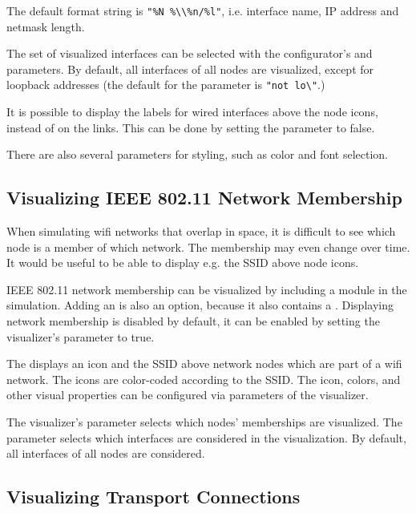 The default format string is
\texttt{"\%N \%\textbackslash\textbackslash\%n/\%l"}, i.e. interface name, IP address and
netmask length.

The set of visualized interfaces can be selected with the configurator's
 and  parameters. By default, all
interfaces of all nodes are visualized, except for loopback addresses (the default for the
 parameter is \texttt{"not lo\textbackslash*"}.)

It is possible to display the labels for wired interfaces above the node icons,
instead of on the links. This can be done by setting the
 parameter to false.

There are also several parameters for styling, such as color and font selection.


\subsection{Visualizing IEEE 802.11 Network Membership}

When simulating wifi networks that overlap in space, it is difficult to see
which node is a member of which network. The membership may even change over
time. It would be useful to be able to display e.g. the SSID above node icons.

IEEE 802.11 network membership can be visualized by including a
 module in the simulation. Adding an  is
also an option, because it also contains a . Displaying
network membership is disabled by default, it can be enabled by setting the
visualizer's  parameter to true.

The  displays an icon and the SSID above network nodes which
are part of a wifi network. The icons are color-coded according to the SSID. The
icon, colors, and other visual properties can be configured via parameters of
the visualizer.

The visualizer's  parameter selects which nodes' memberships are
visualized. The  parameter selects which interfaces are
considered in the visualization. By default, all interfaces of all nodes are
considered.


\subsection{Visualizing Transport Connections}


